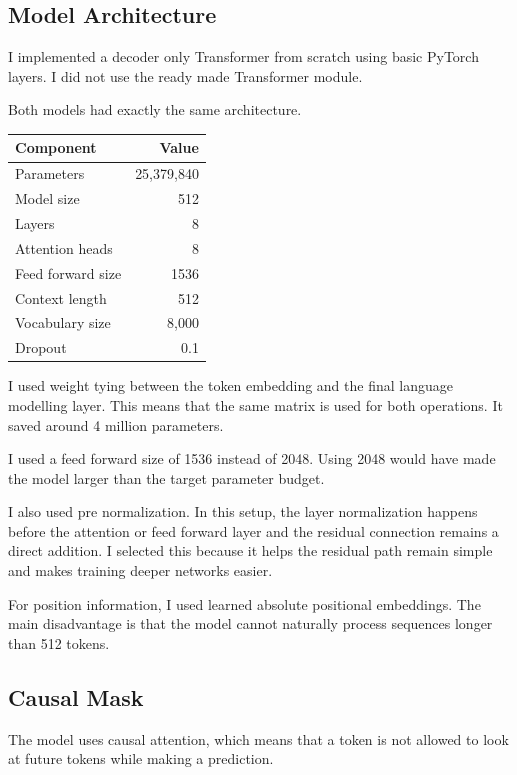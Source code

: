 \documentclass[twocolumn, 10pt]{article}
\begin{document}
\subsection{Model Architecture}
I implemented a decoder only Transformer from scratch using basic PyTorch layers. I did not use the ready made Transformer module.

Both models had exactly the same architecture.

\begin{table}[h]
\centering
\begin{tabular}{lr}
\toprule
Component & Value \\
\midrule
Parameters & 25,379,840 \\
Model size & 512 \\
Layers & 8 \\
Attention heads & 8 \\
Feed forward size & 1536 \\
Context length & 512 \\
Vocabulary size & 8,000 \\
Dropout & 0.1 \\
\bottomrule
\end{tabular}
\end{table}

I used weight tying between the token embedding and the final language modelling layer. This means that the same matrix is used for both operations. It saved around 4 million parameters.

I used a feed forward size of 1536 instead of 2048. Using 2048 would have made the model larger than the target parameter budget.

I also used pre normalization. In this setup, the layer normalization happens before the attention or feed forward layer and the residual connection remains a direct addition. I selected this because it helps the residual path remain simple and makes training deeper networks easier.

For position information, I used learned absolute positional embeddings. The main disadvantage is that the model cannot naturally process sequences longer than 512 tokens.

\subsection{Causal Mask}
The model uses causal attention, which means that a token is not allowed to look at future tokens while making a prediction.
\end{document}
